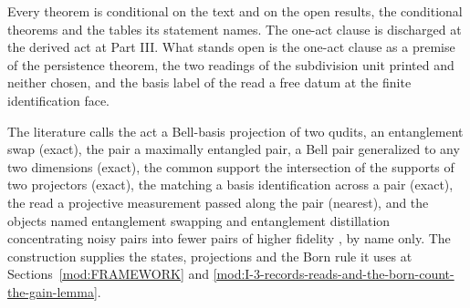 Every theorem is conditional on the text and on the open results, the conditional theorems and the tables its statement names. The one-act clause is discharged at the derived act at Part III. What stands open is the one-act clause as a premise of the persistence theorem, the two readings of the subdivision unit printed and neither chosen, and the basis label of the read a free datum at the finite identification face.
\begin{chbridge}
The literature calls the act a Bell-basis projection of two qudits, an entanglement swap (exact), the pair a maximally entangled pair, a Bell pair generalized to any two dimensions (exact), the common support the intersection of the supports of two projectors (exact), the matching a basis identification across a pair (exact), the read a projective measurement passed along the pair (nearest), and the objects named entanglement swapping \cite{Zukowski1993} and entanglement distillation concentrating noisy pairs into fewer pairs of higher fidelity \cite{Bennett1996,Nielsen2000}, by name only. The construction supplies the states, projections and the Born rule it uses at Sections~\ref{mod:FRAMEWORK} and \ref{mod:I-3-records-reads-and-the-born-count-the-gain-lemma}.
\end{chbridge}
